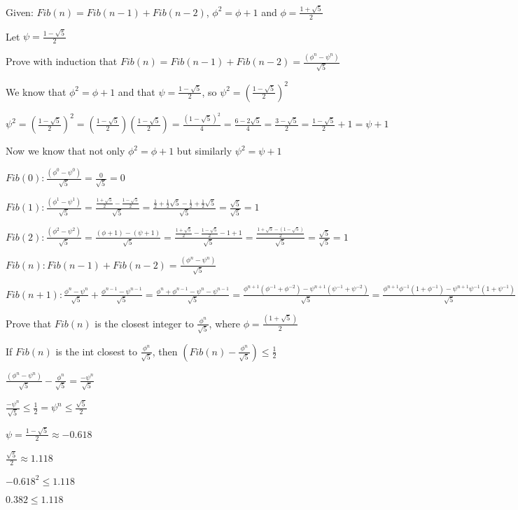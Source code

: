 \documentclass{12pt}{article}
\begin{document}
Given: $ Fib(n) = Fib(n - 1) + Fib(n - 2) $,  $ \phi^2 = \phi + 1 $ and $ \phi = \frac{1 + \sqrt{5}}{2} $

Let $ \psi = \frac{1-\sqrt{5}}{2} $

Prove with induction that $ Fib(n) = Fib(n - 1) + Fib(n - 2) = \frac{(\phi^n-\psi^n)}{\sqrt{5}} $

We know that $ \phi^2 = \phi + 1$ and that $\psi = \frac{1-\sqrt{5}}{2}$, so $\psi^2 = (\frac{1-\sqrt{5}}{2})^2 $

$ \psi^2 = (\frac{1-\sqrt{5}}{2})^2 = (\frac{1-\sqrt{5}}{2})(\frac{1-\sqrt{5}}{2}) = \frac{(1-\sqrt{5})^2}{4} = \frac{6-2\sqrt5}{4} = \frac{3-\sqrt{5}}{2} = \frac{1-\sqrt{5}}{2} + 1 = \psi + 1 $

Now we know that not only $ \phi^2 = \phi + 1$ but similarly $\psi^2 = \psi + 1 $

$ Fib(0): \frac{(\phi^0-\psi^0)}{\sqrt{5}} = \frac{0}{\sqrt{5}} = 0 $

$ Fib(1): \frac{(\phi^1-\psi^1)}{\sqrt{5}} = \frac{\frac{1 + \sqrt{5}}{2} - \frac{1 - \sqrt{5}}{2}}{\sqrt{5}} = \frac{\frac{1}{2} + \frac{1}{2}\sqrt{5} - \frac{1}{2} + \frac{1}{2}\sqrt{5}}{\sqrt{5}} = \frac{\sqrt{5}}{\sqrt{5}} = 1 $

$ Fib(2): \frac{(\phi^2-\psi^2)}{\sqrt{5}} = \frac{(\phi + 1) - (\psi + 1)}{\sqrt{5}} = \frac{\frac{1 + \sqrt{5}}{2} - \frac{1 - \sqrt{5}}{2} - 1 + 1}{\sqrt{5}} = \frac{\frac{1 + \sqrt{5} - (1 - \sqrt{5})}{2}}{\sqrt{5}} = \frac{\sqrt{5}}{\sqrt{5}} = 1 $

$ Fib(n): Fib(n - 1) + Fib(n - 2) = \frac{(\phi^n-\psi^n)}{\sqrt{5}} $

$ Fib(n+1): \frac{\phi^n - \psi^n}{\sqrt{5}} + \frac{\phi^{n - 1} - \psi^{n - 1}}{\sqrt{5}} = \frac{\phi^n + \phi^{n - 1} - \psi^n - \psi^{n - 1}}{\sqrt{5}} = \frac{\phi^{n + 1}(\phi^{-1} + \phi^{-2}) - \psi^{n + 1}(\psi^{-1} + \psi^{-2})}{\sqrt{5}} = \frac{\phi^{n + 1}\phi^{-1}(1 + \phi^{-1}) - \psi^{n + 1}\psi^{-1}(1 + \psi^{-1})}{\sqrt{5}} = \frac{\phi^{n + 1}\phi^{-1}\phi - \psi^{n + 1}\psi^{-1}\psi}{\sqrt{5}} = \frac{\phi^{n + 1} - \psi^{n + 1}}{\sqrt{5}} $

Prove that $ Fib(n) $ is the closest integer to $ \frac{\phi^n}{\sqrt{5}} $, where $ \phi = \frac{(1 + \sqrt{5})}{2} $

If $ Fib(n) $ is the int closest to $ \frac{\phi^n}{\sqrt{5}} $, then $ (Fib(n) - \frac{\phi^n}{\sqrt{5}}) \leq \frac{1}{2} $

$ \frac{(\phi^n-\psi^n)}{\sqrt{5}} - \frac{\phi^n}{\sqrt{5}} = \frac{-\psi^n}{\sqrt{5}} $

$ \frac{-\psi^n}{\sqrt{5}} \leq \frac{1}{2} = \psi^n \leq \frac{\sqrt{5}}{2} $

$ \psi = \frac{1-\sqrt{5}}{2} \approx -0.618 $

$ \frac{\sqrt{5}}{2} \approx 1.118 $

$ -0.618^2 \leq 1.118 $

$ 0.382 \leq 1.118 $
\end{document}
